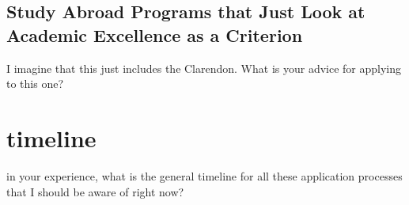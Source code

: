 \documentclass[12pt]{article}
\begin{document}
\subsection{Study Abroad Programs that Just Look at Academic Excellence as a Criterion}
I imagine that this just includes the Clarendon. What is your advice for applying to this one?

\section{timeline}
in your experience, what is the general timeline for all these application processes that I should be aware of right now?
\end{document}
